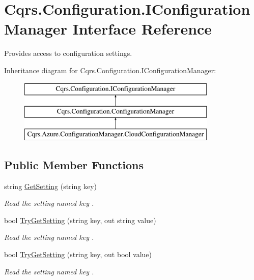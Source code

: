 \hypertarget{interfaceCqrs_1_1Configuration_1_1IConfigurationManager}{}\section{Cqrs.\+Configuration.\+I\+Configuration\+Manager Interface Reference}
\label{interfaceCqrs_1_1Configuration_1_1IConfigurationManager}


Provides access to configuration settings.  


Inheritance diagram for Cqrs.\+Configuration.\+I\+Configuration\+Manager\+:\begin{figure}[H]
\begin{center}
\leavevmode
\includegraphics[height=3.000000cm]{interfaceCqrs_1_1Configuration_1_1IConfigurationManager}
\end{center}
\end{figure}
\subsection*{Public Member Functions}
\begin{DoxyCompactItemize}
\item 
string \hyperlink{interfaceCqrs_1_1Configuration_1_1IConfigurationManager_a9f7b7d4d8c26a0589f01c8a7f69901ef_a9f7b7d4d8c26a0589f01c8a7f69901ef}{Get\+Setting} (string key)
\begin{DoxyCompactList}\small\item\em Read the setting named {\itshape key} . \end{DoxyCompactList}\item 
bool \hyperlink{interfaceCqrs_1_1Configuration_1_1IConfigurationManager_ac4478405e3d9e1c97d14953aea4e695b_ac4478405e3d9e1c97d14953aea4e695b}{Try\+Get\+Setting} (string key, out string value)
\begin{DoxyCompactList}\small\item\em Read the setting named {\itshape key} . \end{DoxyCompactList}\item 
bool \hyperlink{interfaceCqrs_1_1Configuration_1_1IConfigurationManager_a8389181330999fcb8e30af4dbb56d35e_a8389181330999fcb8e30af4dbb56d35e}{Try\+Get\+Setting} (string key, out bool value)
\begin{DoxyCompactList}\small\item\em Read the setting named {\itshape key} . \end{DoxyCompactList}\end{DoxyCompactItemize}


